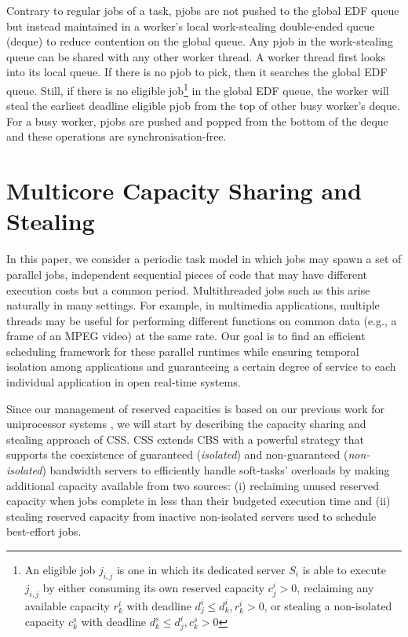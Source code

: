\documentclass[10pt,twocolumn]{article}
\begin{document}
Contrary to regular jobs of a task, pjobs are not pushed to the global EDF queue but instead maintained in a worker's local work-stealing double-ended queue (deque) to reduce contention on the global queue. Any pjob in the work-stealing queue can be shared with any other worker thread. A worker thread first looks into its local queue. If there is no pjob to pick, then it searches the global EDF queue. Still, if there is no eligible job\footnote{An eligible job $j_{i,j}$ is one in which its dedicated server $S_i$ is able to execute $j_{i,j}$ by either consuming its own reserved capacity $c^i_j > 0$, reclaiming any available capacity $r^i_k$ with deadline $d^i_j \le d^i_k, r^i_k > 0$, or stealing a non-isolated capacity $c^s_k$ with deadline $d^s_k \leq d^i_j, c^s_k > 0$} in the global EDF queue, the worker will steal the earliest deadline eligible pjob from the top of other busy worker's deque. For a busy worker, pjobs are pushed and popped from the bottom of the deque and these operations are synchronisation-free.

\section{Multicore Capacity Sharing and Stealing}

In this paper, we consider a periodic task model in which jobs may spawn a set of parallel jobs, independent sequential pieces of code that may have different execution costs but a common period. Multithreaded jobs such as this arise naturally in many settings. For example, in multimedia applications, multiple threads may be useful for performing different functions on common data (e.g., a frame of an MPEG video) at the same rate. Our goal is to find an efficient scheduling framework for these parallel runtimes while ensuring temporal isolation among applications and guaranteeing a certain degree of service to each individual application in open real-time systems. 

Since our management of reserved capacities is based on our previous work for uniprocessor systems \cite{luisJSA10}, we will start by describing the capacity sharing and stealing approach of CSS. CSS extends CBS \cite{abeni98} with a powerful strategy that supports the coexistence of guaranteed (\emph{isolated}) and non-guaranteed (\emph{non-isolated}) bandwidth servers to efficiently handle soft-tasks' overloads by making additional capacity available from two sources: (i) reclaiming unused reserved capacity when jobs complete in less than their budgeted execution time and (ii) stealing reserved capacity from inactive non-isolated servers used to schedule best-effort jobs.
\end{document}
